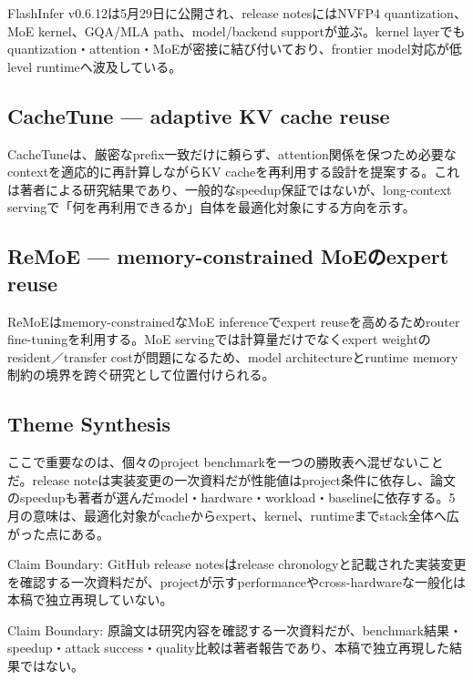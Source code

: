 FlashInfer v0.6.12は5月29日に公開され、release notesにはNVFP4 quantization、MoE kernel、GQA/MLA path、model/backend supportが並ぶ。kernel layerでもquantization・attention・MoEが密接に結び付いており、frontier model対応が低level runtimeへ波及している。\autocite{src-74a7052acd7a}


\subsection{CacheTune — adaptive KV cache reuse}

CacheTuneは、厳密なprefix一致だけに頼らず、attention関係を保つため必要なcontextを適応的に再計算しながらKV cacheを再利用する設計を提案する。これは著者による研究結果であり、一般的なspeedup保証ではないが、long-context servingで「何を再利用できるか」自体を最適化対象にする方向を示す。\autocite{src-3707e05fd2a3}


\subsection{ReMoE — memory-constrained MoEのexpert reuse}

ReMoEはmemory-constrainedなMoE inferenceでexpert reuseを高めるためrouter fine-tuningを利用する。MoE servingでは計算量だけでなくexpert weightのresident／transfer costが問題になるため、model architectureとruntime memory制約の境界を跨ぐ研究として位置付けられる。\autocite{src-ba75040df3fc}


\subsection{Theme Synthesis}

ここで重要なのは、個々のproject benchmarkを一つの勝敗表へ混ぜないことだ。release noteは実装変更の一次資料だが性能値はproject条件に依存し、論文のspeedupも著者が選んだmodel・hardware・workload・baselineに依存する。5月の意味は、最適化対象がcacheからexpert、kernel、runtimeまでstack全体へ広がった点にある。\autocite{src-3707e05fd2a3,src-5a693cfc6852,src-69c5523286bd,src-74a7052acd7a,src-77e29e3fac8f,src-80b8d67933c0,src-ba75040df3fc,src-c97320147e8c}


\begin{claimboundary}
Claim Boundary: GitHub release notesはrelease chronologyと記載された実装変更を確認する一次資料だが、projectが示すperformanceやcross-hardwareな一般化は本稿で独立再現していない。\autocite{src-3707e05fd2a3,src-5a693cfc6852,src-69c5523286bd,src-74a7052acd7a,src-77e29e3fac8f,src-80b8d67933c0,src-ba75040df3fc,src-c97320147e8c}
\end{claimboundary}

\begin{claimboundary}
Claim Boundary: 原論文は研究内容を確認する一次資料だが、benchmark結果・speedup・attack success・quality比較は著者報告であり、本稿で独立再現した結果ではない。\autocite{src-3707e05fd2a3,src-5a693cfc6852,src-69c5523286bd,src-74a7052acd7a,src-77e29e3fac8f,src-80b8d67933c0,src-ba75040df3fc,src-c97320147e8c}
\end{claimboundary}
